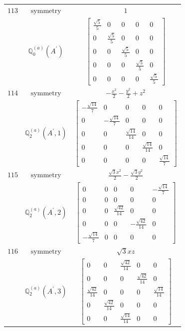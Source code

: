 \documentclass[fleqn,8pt,landscape]{jsarticle}
\begin{document}
\begin{longtable}{ccc}
$ 113 $ & $ \text{symmetry} $ & $ 1 $ \\
$  $ & $ \mathbb{Q}_{0}^{(a)}(A^{\prime}) $ & $ \begin{bmatrix} \frac{\sqrt{5}}{5} & 0 & 0 & 0 & 0 \\ 0 & \frac{\sqrt{5}}{5} & 0 & 0 & 0 \\ 0 & 0 & \frac{\sqrt{5}}{5} & 0 & 0 \\ 0 & 0 & 0 & \frac{\sqrt{5}}{5} & 0 \\ 0 & 0 & 0 & 0 & \frac{\sqrt{5}}{5} \end{bmatrix} $ \\ \hline
$ 114 $ & $ \text{symmetry} $ & $ - \frac{x^{2}}{2} - \frac{y^{2}}{2} + z^{2} $ \\
$  $ & $ \mathbb{Q}_{2}^{(a)}(A^{\prime},1) $ & $ \begin{bmatrix} - \frac{\sqrt{14}}{7} & 0 & 0 & 0 & 0 \\ 0 & - \frac{\sqrt{14}}{7} & 0 & 0 & 0 \\ 0 & 0 & \frac{\sqrt{14}}{14} & 0 & 0 \\ 0 & 0 & 0 & \frac{\sqrt{14}}{14} & 0 \\ 0 & 0 & 0 & 0 & \frac{\sqrt{14}}{7} \end{bmatrix} $ \\ \hline
$ 115 $ & $ \text{symmetry} $ & $ \frac{\sqrt{3} x^{2}}{2} - \frac{\sqrt{3} y^{2}}{2} $ \\
$  $ & $ \mathbb{Q}_{2}^{(a)}(A^{\prime},2) $ & $ \begin{bmatrix} 0 & 0 & 0 & 0 & - \frac{\sqrt{14}}{7} \\ 0 & 0 & 0 & 0 & 0 \\ 0 & 0 & \frac{\sqrt{42}}{14} & 0 & 0 \\ 0 & 0 & 0 & - \frac{\sqrt{42}}{14} & 0 \\ - \frac{\sqrt{14}}{7} & 0 & 0 & 0 & 0 \end{bmatrix} $ \\ \hline
$ 116 $ & $ \text{symmetry} $ & $ \sqrt{3} x z $ \\
$  $ & $ \mathbb{Q}_{2}^{(a)}(A^{\prime},3) $ & $ \begin{bmatrix} 0 & 0 & \frac{\sqrt{42}}{14} & 0 & 0 \\ 0 & 0 & 0 & \frac{\sqrt{42}}{14} & 0 \\ \frac{\sqrt{42}}{14} & 0 & 0 & 0 & \frac{\sqrt{14}}{14} \\ 0 & \frac{\sqrt{42}}{14} & 0 & 0 & 0 \\ 0 & 0 & \frac{\sqrt{14}}{14} & 0 & 0 \end{bmatrix} $ \\ \hline

\end{longtable}
\end{document}
